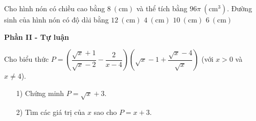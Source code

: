 \begin{ex}%
Cho hình nón có chiều cao bằng $8~(\mathrm{cm})$ và thể tích bằng $96\pi~(\mathrm{cm^3})$. Đường sinh của hình nón có độ dài bằng
\choice 
{$12~(\mathrm{cm})$}
{$4~(\mathrm{cm})$}
{\True $10~(\mathrm{cm})$}
{$6~(\mathrm{cm})$}
\end{ex}
\textbf{Phần II - Tự luận}
\setcounter{ex}{0}
\begin{ex}%
Cho biểu thức $P=\left (\dfrac{\sqrt{x}+1}{\sqrt{x}-2}-\dfrac{2}{x-4}\right ) \left ( \sqrt{x}-1 +\dfrac{\sqrt{x}-4}{\sqrt{x}}\right )$ (với $x>0$ và $x\neq 4$).
\begin{enumerate}
\item[1)]  Chứng minh $P=\sqrt{x}+3$.
\item[2)]  Tìm các giá trị của  $x$ sao cho $P=x+3$.
\end{enumerate}
\end{ex}

